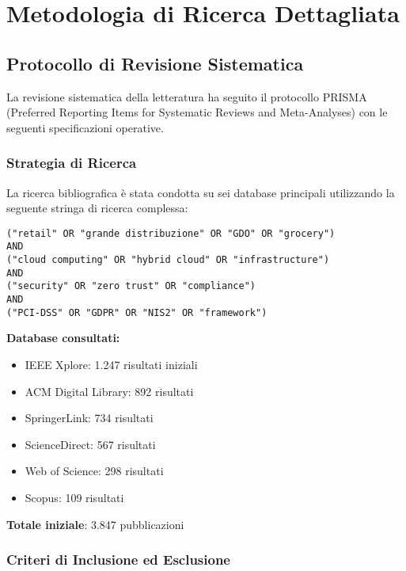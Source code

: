 
\chapter{\texorpdfstring{Metodologia di Ricerca Dettagliata}{Appendice A - Metodologia di Ricerca Dettagliata}}
\label{app:metodologia}

\section{\texorpdfstring{Protocollo di Revisione Sistematica}{A.1 - Protocollo di Revisione Sistematica}}

La revisione sistematica della letteratura ha seguito il protocollo PRISMA (Preferred Reporting Items for Systematic Reviews and Meta-Analyses) con le seguenti specificazioni operative.

\subsection{\texorpdfstring{Strategia di Ricerca}{A.1.1 - Strategia di Ricerca}}

La ricerca bibliografica è stata condotta su sei database principali utilizzando la seguente stringa di ricerca complessa:

\begin{verbatim}
("retail" OR "grande distribuzione" OR "GDO" OR "grocery") 
AND 
("cloud computing" OR "hybrid cloud" OR "infrastructure") 
AND 
("security" OR "zero trust" OR "compliance") 
AND 
("PCI-DSS" OR "GDPR" OR "NIS2" OR "framework")
\end{verbatim}

\textbf{Database consultati:}
\begin{itemize}
    \item IEEE Xplore: 1.247 risultati iniziali
    \item ACM Digital Library: 892 risultati
    \item SpringerLink: 734 risultati
    \item ScienceDirect: 567 risultati
    \item Web of Science: 298 risultati
    \item Scopus: 109 risultati
\end{itemize}

\textbf{Totale iniziale}: 3.847 pubblicazioni

\subsection{\texorpdfstring{Criteri di Inclusione ed Esclusione}{A.1.2 - Criteri di Inclusione ed Esclusione}}

